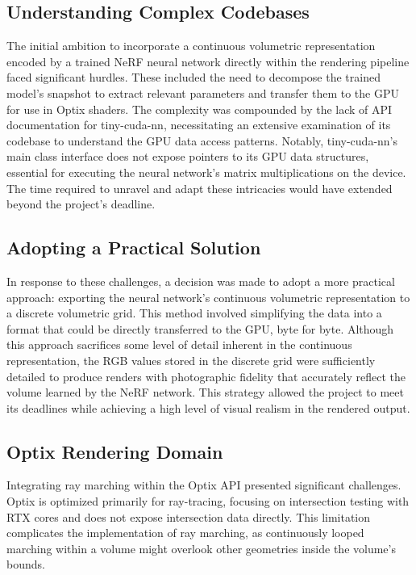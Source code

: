 \documentclass[conference]{IEEEtran}
\begin{document}
\subsection{Understanding Complex Codebases}
The initial ambition to incorporate a continuous volumetric representation encoded by a trained NeRF neural network directly within the rendering pipeline faced significant hurdles. These included the need to decompose the trained model's snapshot to extract relevant parameters and transfer them to the GPU for use in Optix shaders. The complexity was compounded by the lack of API documentation for tiny-cuda-nn, necessitating an extensive examination of its codebase to understand the GPU data access patterns. Notably, tiny-cuda-nn’s main class interface does not expose pointers to its GPU data structures, essential for executing the neural network's matrix multiplications on the device. The time required to unravel and adapt these intricacies would have extended beyond the project’s deadline\cite{tiny-cuda-nn, mueller2022instant}.

\subsection{Adopting a Practical Solution}
In response to these challenges, a decision was made to adopt a more practical approach: exporting the neural network's continuous volumetric representation to a discrete volumetric grid. This method involved simplifying the data into a format that could be directly transferred to the GPU, byte for byte. Although this approach sacrifices some level of detail inherent in the continuous representation, the RGB values stored in the discrete grid were sufficiently detailed to produce renders with photographic fidelity that accurately reflect the volume learned by the NeRF network. This strategy allowed the project to meet its deadlines while achieving a high level of visual realism in the rendered output.

\subsection{Optix Rendering Domain}
Integrating ray marching within the Optix API presented significant challenges. Optix is optimized primarily for ray-tracing, focusing on intersection testing with RTX cores and does not expose intersection data directly\cite{OptixManual}. This limitation complicates the implementation of ray marching, as continuously looped marching within a volume might overlook other geometries inside the volume's bounds.
\end{document}
